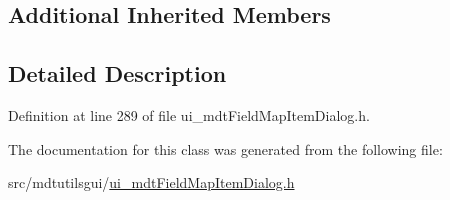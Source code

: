 \subsection*{Additional Inherited Members}


\subsection{Detailed Description}


Definition at line 289 of file ui\-\_\-mdt\-Field\-Map\-Item\-Dialog.\-h.



The documentation for this class was generated from the following file\-:\begin{DoxyCompactItemize}
\item 
src/mdtutilsgui/\hyperlink{ui__mdt_field_map_item_dialog_8h}{ui\-\_\-mdt\-Field\-Map\-Item\-Dialog.\-h}\end{DoxyCompactItemize}

